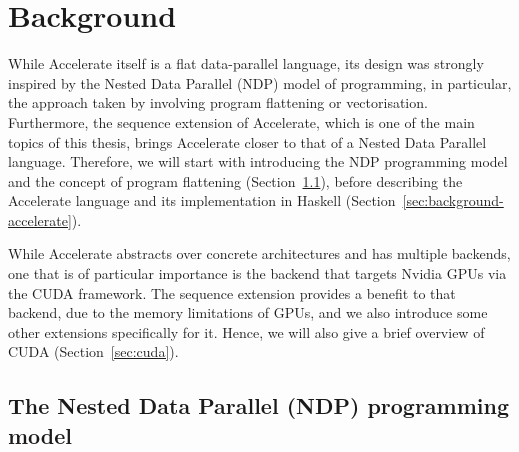 \chapter{Background}
\label{chap:background}


While Accelerate itself is a flat data-parallel language, its design was strongly inspired by the Nested Data Parallel (NDP) model of programming, in particular, the approach taken by \citet{Blelloch:compiling1988} involving program flattening or vectorisation. Furthermore, the sequence extension of Accelerate, which is one of the main topics of this thesis, brings Accelerate closer to that of a Nested Data Parallel language. Therefore, we will start with introducing the NDP programming model and the concept of program flattening (Section~\ref{sec:ndp}), before describing the Accelerate language and its implementation in Haskell (Section~\ref{sec:background-accelerate}).

While Accelerate abstracts over concrete architectures and has multiple backends, one that is of particular importance is the backend that targets Nvidia GPUs via the CUDA framework. The sequence extension provides a benefit to that backend, due to the memory limitations of GPUs, and we also introduce some other extensions specifically for it. Hence, we will also give a brief overview of CUDA (Section~\ref{sec:cuda}).



\section{The Nested Data Parallel (NDP) programming model}
\label{sec:ndp}

